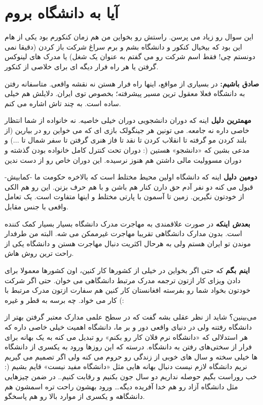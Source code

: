 \section{آیا به دانشگاه بروم}
این سوال رو زیاد می پرسن. راستش رو بخواین من هم زمان کنکورم بود یکی از 
هام این بود که بیخیال کنکور و دانشگاه بشم و برم سراغ شرکت باز کردن (دقیقا نمی دونستم چی! فقط اسم شرکت رو می گفتم به عنوان یک شغل) یا مدرک های لینوکس گرفتن یا هر راه فرار دیگه ای برای خلاصی از کنکور.

\textbf{صادق باشیم:}
در بسیاری از مواقع، اینها راه فرار هستن نه نقشه واقعی. متاسفانه رفتن به دانشگاه فعلا معقول ترین مسیر پیشرفته؛ بخصوص توی ایران. دلایلش هم خیلی ساده است. به چند تاش اشاره می کنم.

\textbf{مهمترین دلیل}
اینه که دوران دانشجویی دوران خیلی خاصیه. نه خانواده از شما انتظار خاصی داره نه جامعه. می تونین هر جینگولک بازی ای که می خواین رو در بیارین (از بلند کردن مو گرفته تا انقلاب کردن تا نقد تا فاز هنری گرفتن تا سفر شمال تا ...) و مدعی بشین که «دانشجو» هستین (: دوران تحت کنترل کامل خانواده بودن گذشته و دوران مسوولیت مالی داشتن هم هنوز نرسیده. این دوران خاص رو از دست ندین

\textbf{دومین دلیل}
اینه که دانشگاه اولین محیط مختلط است که بالاخره حکومت ما -کمابیش- قبول می کنه دو نفر آدم حق دارن کنار هم باشن و با هم حرف بزنن. این رو هم الکی از خودتون نگیرین. زمین تا آسمون با پارتی مختلط و اینها متفاوت است. یک تعامل واقعی با جنس مقابل.

\textbf{بعدش اینکه}
در صورت علاقمندی به مهاجرت مدرک دانشگاه بسیار بسیار کمک کننده است. بدون مدارک دانشگاهی تقریبا مهاجرت غیرممکن می شه. البته من طرفدار موندن تو ایران هستم ولی به هرحال اکثریت دنبال مهاجرت هستن و دانشگاه یکی از راحت ترین روش هاش.

\textbf{اینم بگم}
که حتی اگر بخواین در خیلی از کشورها کار کنین، اون کشورها معمولا برای دادن ویزای کار ازتون ترجمه مدرک مرتبط دانشگاهی می خوان. حتی اگر شرکت خودتون بخواد شما رو بفرسته افغانستان کار کنین هم سفارت ازتون مدرک مرتبط با کار می خواد. چه برسه به قطر و غیره (:

می‌بینین؟‌ شاید از نظر عقلی بشه گفت که در سطح علمی مدارک معتبر گرفتن بهتر از دانشگاه رفتنه ولی در دنیای واقعی دور و بر ما، دانشگاه اهمیت خیلی خاصی داره که هر استدلالی که «دانشگاه نرم فلان کار رو بکنم»‌ رو تبدیل می کنه به یک بهانه برای فرار از سختی‌های رفتن به دانشگاه. درسته که این روزها ورود به یکسری از دانشگاه ها خیلی سخته و سال های خوبی از زندگی رو حروم می کنه ولی اگر تصمیم می گیریم نریم دانشگاه لازم نیست دنبال بهانه هایی مثل «دانشگاه مفید نیست» قایم بشیم (:‌ خب روراست بگیم حوصله نداریم دو سال جون بکنیم و رقابت کنیم.. در ضمن چیزهایی مثل دانشگاه آزاد رو هم خدا آفریده دیگه… ورود بهشون راحت تره اسمشون هم دانشگاهه و یکسری از موارد بالا رو هم پاسخگو.

